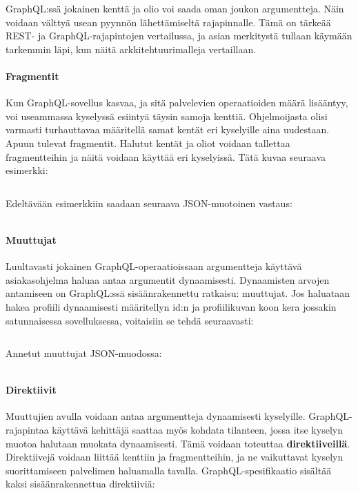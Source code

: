 GraphQL:ssä jokainen kenttä ja olio voi saada oman joukon argumentteja. Näin voidaan välttyä usean pyynnön lähettämiseltä rajapinnalle. Tämä on tärkeää REST- ja GraphQL-rajapintojen vertailussa, ja asian merkitystä tullaan käymään tarkemmin läpi, kun näitä arkkitehtuurimalleja vertaillaan. \cite{QueriesAndMutations}

\paragraph{Fragmentit} Kun GraphQL-sovellus kasvaa, ja sitä palvelevien operaatioiden määrä lisääntyy, voi useammassa kyselyssä esiintyä täysin samoja kenttiä. Ohjelmoijasta olisi varmasti turhauttavaa määritellä samat kentät eri kyselyille aina uudestaan. Apuun tulevat fragmentit. Halutut kentät ja oliot voidaan tallettaa fragmentteihin ja näitä voidaan käyttää eri kyselyissä. \cite{QueriesAndMutations} Tätä kuvaa seuraava esimerkki:

\inputminted{gql.py:GraphQLLexer -x}{listaukset/esimerkki2.graphql}

Edeltävään esimerkkiin saadaan seuraava JSON-muotoinen vastaus:

\inputminted{json}{listaukset/esimerkki2.json}

\paragraph{Muuttujat} Luultavasti jokainen GraphQL-operaatioissaan argumentteja käyttävä asiakasohjelma haluaa antaa argumentit dynaamisesti. Dynaamisten arvojen antamiseen on GraphQL:ssä sisäänrakennettu ratkaisu: muuttujat. \cite{QueriesAndMutations} Jos haluataan hakea profiili dynaamisesti määritellyn id:n ja profiilikuvan koon kera jossakin satunnaisessa sovelluksessa, voitaisiin se tehdä seuraavasti:

\inputminted{gql.py:GraphQLLexer -x}{listaukset/esimerkki4.graphql}

Annetut muuttujat JSON-muodossa:

\inputminted{json}{listaukset/esimerkki4-vars.json}

\paragraph{Direktiivit} Muuttujien avulla voidaan antaa argumentteja dynaamisesti kyselyille. GraphQL-rajapintaa käyttävä kehittäjä saattaa myös kohdata tilanteen, jossa itse kyselyn muotoa halutaan muokata dynaamisesti. Tämä voidaan toteuttaa \textbf{direktiiveillä}. Direktiivejä voidaan liittää kenttiin ja fragmentteihin, ja ne vaikuttavat kyselyn suorittamiseen palvelimen haluamalla tavalla. GraphQL-spesifikaatio sisältää kaksi sisäänrakennettua direktiiviä:

